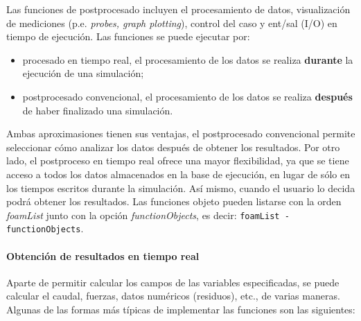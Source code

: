 Las funciones de postprocesado incluyen el procesamiento de datos,
visualización de mediciones (p.e. \emph{probes, graph plotting}),
control del caso y ent/sal (I/O) en tiempo de ejecución. Las funciones
se puede ejecutar por:

\begin{itemize}
\item
  procesado en tiempo real, el procesamiento de los datos se realiza
  \textbf{durante} la ejecución de una simulación;
\item
  postprocesado convencional, el procesamiento de los datos se realiza
  \textbf{después} de haber finalizado una simulación.
\end{itemize}

Ambas aproximasiones tienen sus ventajas, el postprocesado convencional
permite seleccionar cómo analizar los datos después de obtener los
resultados. Por otro lado, el postproceso en tiempo real ofrece una
mayor flexibilidad, ya que se tiene acceso a todos los datos almacenados
en la base de ejecución, en lugar de sólo en los tiempos escritos
durante la simulación. Así mismo, cuando el usuario lo decida podrá
obtener los resultados. Las funciones objeto pueden listarse con la
orden \emph{foamList} junto con la opción \emph{functionObjects}, es
decir: \texttt{foamList\ -functionObjects}.

\paragraph{Obtención de resultados en tiempo real}\label{header-n395}

Aparte de permitir calcular los campos de las variables especificadas,
se puede calcular el caudal, fuerzas, datos numéricos (residuos), etc.,
de varias maneras. Algunas de las formas más típicas de implementar las
funciones son las siguientes:

